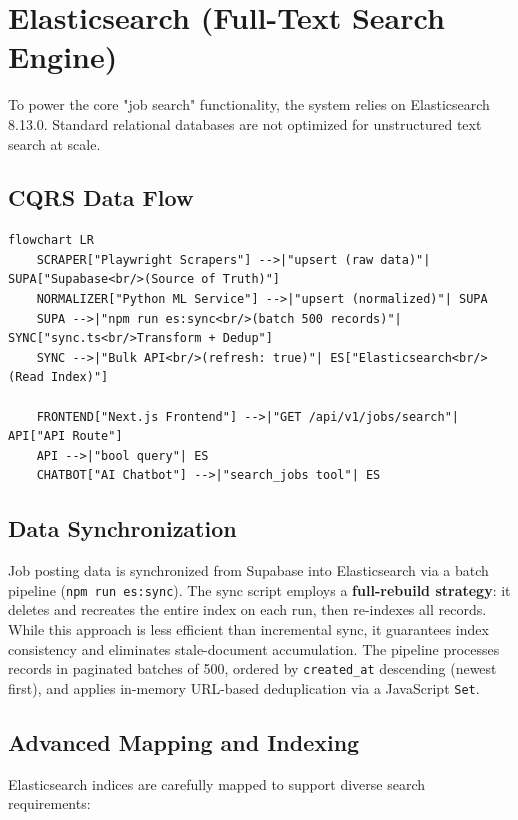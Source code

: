 \section{Elasticsearch (Full-Text Search Engine)}

To power the core "job search" functionality, the system relies on Elasticsearch 8.13.0. Standard relational databases are not optimized for unstructured text search at scale.

\subsection{CQRS Data Flow}

\begin{verbatim}
flowchart LR
    SCRAPER["Playwright Scrapers"] -->|"upsert (raw data)"| SUPA["Supabase<br/>(Source of Truth)"]
    NORMALIZER["Python ML Service"] -->|"upsert (normalized)"| SUPA
    SUPA -->|"npm run es:sync<br/>(batch 500 records)"| SYNC["sync.ts<br/>Transform + Dedup"]
    SYNC -->|"Bulk API<br/>(refresh: true)"| ES["Elasticsearch<br/>(Read Index)"]
    
    FRONTEND["Next.js Frontend"] -->|"GET /api/v1/jobs/search"| API["API Route"]
    API -->|"bool query"| ES
    CHATBOT["AI Chatbot"] -->|"search_jobs tool"| ES
\end{verbatim}

\subsection{Data Synchronization}
Job posting data is synchronized from Supabase into Elasticsearch via a batch pipeline (\texttt{npm run es:sync}). The sync script employs a \textbf{full-rebuild strategy}: it deletes and recreates the entire index on each run, then re-indexes all records. While this approach is less efficient than incremental sync, it guarantees index consistency and eliminates stale-document accumulation. The pipeline processes records in paginated batches of 500, ordered by \texttt{created\_at} descending (newest first), and applies in-memory URL-based deduplication via a JavaScript \texttt{Set}.

\subsection{Advanced Mapping and Indexing}
Elasticsearch indices are carefully mapped to support diverse search requirements:

